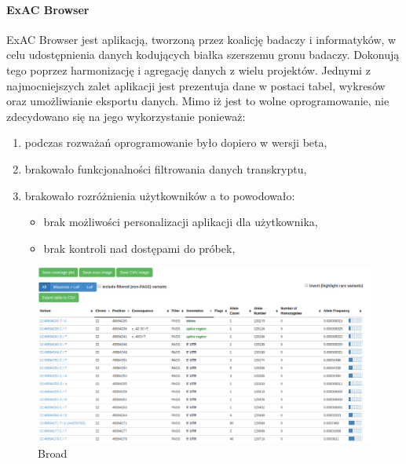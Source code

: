 \documentclass[a4paper,12pt,twoside]{article}
\begin{document}
\paragraph{ExAC Browser} ExAC Browser \cite{exac} \cite{exacCite} jest aplikacją, tworzoną przez koalicję badaczy i informatyków, w celu
udostępnienia danych kodujących białka szerszemu gronu badaczy. 
Dokonują tego poprzez harmonizację i agregację danych z wielu projektów.
Jednymi z najmocniejszych zalet aplikacji jest prezentuja dane w postaci tabel, wykresów oraz umożliwianie eksportu danych.
Mimo iż jest to wolne oprogramowanie, nie zdecydowano się na jego wykorzystanie
ponieważ:
\begin{enumerate}[1)]
\item podczas rozważań oprogramowanie było dopiero w wersji beta, 
\item brakowało funkcjonalności filtrowania danych transkryptu,
\item brakowało rozróżnienia użytkowników a to powodowało:
\begin{itemize}
\item brak możliwości personalizacji aplikacji dla użytkownika,
\item brak kontroli nad dostępami do próbek,
\end{itemize}
\end{enumerate}

\begin{figure}[h]
\includegraphics[width=\linewidth]{obrazy/exac/broad.png}
  \caption{Broad}
  \label{fig:broadpic}
\end{figure}

\end{document}
